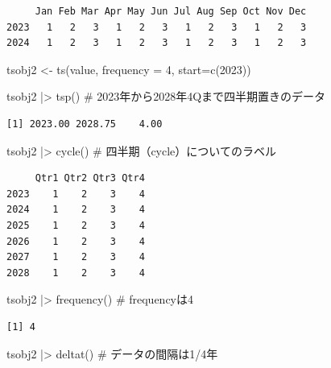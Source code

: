 \documentclass[
  letterpaper,
  DIV=11,
  numbers=noendperiod]{scrreprt}
\newenvironment{Shaded}{\begin{snugshade}}{\end{snugshade}}
\newcommand{\AttributeTok}[1]{\textcolor[rgb]{0.40,0.45,0.13}{#1}}
\newcommand{\CommentTok}[1]{\textcolor[rgb]{0.37,0.37,0.37}{#1}}
\newcommand{\DecValTok}[1]{\textcolor[rgb]{0.68,0.00,0.00}{#1}}
\newcommand{\FunctionTok}[1]{\textcolor[rgb]{0.28,0.35,0.67}{#1}}
\newcommand{\NormalTok}[1]{\textcolor[rgb]{0.00,0.23,0.31}{#1}}
\newcommand{\OtherTok}[1]{\textcolor[rgb]{0.00,0.23,0.31}{#1}}
\newcommand{\SpecialCharTok}[1]{\textcolor[rgb]{0.37,0.37,0.37}{#1}}
\begin{document}
\begin{verbatim}
     Jan Feb Mar Apr May Jun Jul Aug Sep Oct Nov Dec
2023   1   2   3   1   2   3   1   2   3   1   2   3
2024   1   2   3   1   2   3   1   2   3   1   2   3
\end{verbatim}

\begin{Shaded}
\begin{Highlighting}[]
\NormalTok{tsobj2 }\OtherTok{\textless{}{-}} \FunctionTok{ts}\NormalTok{(value, }\AttributeTok{frequency =} \DecValTok{4}\NormalTok{, }\AttributeTok{start=}\FunctionTok{c}\NormalTok{(}\DecValTok{2023}\NormalTok{))}

\NormalTok{tsobj2 }\SpecialCharTok{|\textgreater{}} \FunctionTok{tsp}\NormalTok{() }\CommentTok{\# 2023年から2028年4Qまで四半期置きのデータ}
\end{Highlighting}
\end{Shaded}

\begin{verbatim}
[1] 2023.00 2028.75    4.00
\end{verbatim}

\begin{Shaded}
\begin{Highlighting}[]
\NormalTok{tsobj2 }\SpecialCharTok{|\textgreater{}} \FunctionTok{cycle}\NormalTok{() }\CommentTok{\# 四半期（cycle）についてのラベル}
\end{Highlighting}
\end{Shaded}

\begin{verbatim}
     Qtr1 Qtr2 Qtr3 Qtr4
2023    1    2    3    4
2024    1    2    3    4
2025    1    2    3    4
2026    1    2    3    4
2027    1    2    3    4
2028    1    2    3    4
\end{verbatim}

\begin{Shaded}
\begin{Highlighting}[]
\NormalTok{tsobj2 }\SpecialCharTok{|\textgreater{}} \FunctionTok{frequency}\NormalTok{() }\CommentTok{\# frequencyは4}
\end{Highlighting}
\end{Shaded}

\begin{verbatim}
[1] 4
\end{verbatim}

\begin{Shaded}
\begin{Highlighting}[]
\NormalTok{tsobj2 }\SpecialCharTok{|\textgreater{}} \FunctionTok{deltat}\NormalTok{() }\CommentTok{\# データの間隔は1/4年}
\end{Highlighting}
\end{Shaded}
\end{document}

